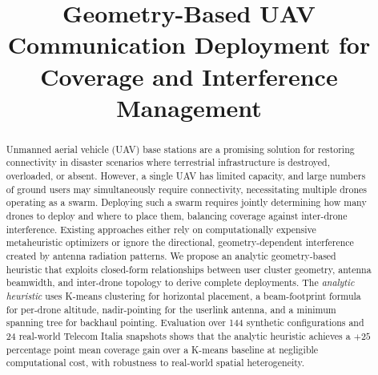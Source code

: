 \documentclass[conference]{IEEEtran}
\begin{document}

\title{Geometry-Based UAV Communication Deployment for Coverage and Interference Management}




\author{
}


\maketitle

\begin{abstract}
Unmanned aerial vehicle (UAV) base stations are a promising solution for restoring connectivity in disaster scenarios where terrestrial infrastructure is destroyed, overloaded, or absent. However, a single UAV has limited capacity, and large numbers of ground users may simultaneously require connectivity, necessitating multiple drones operating as a swarm. Deploying such a swarm requires jointly determining how many drones to deploy and where to place them, balancing coverage against inter-drone interference. Existing approaches either rely on computationally expensive metaheuristic optimizers or ignore the directional, geometry-dependent interference created by antenna radiation patterns. We propose an analytic geometry-based heuristic that exploits closed-form relationships between user cluster geometry, antenna beamwidth, and inter-drone topology to derive complete deployments. The \emph{analytic heuristic} uses K-means clustering for horizontal placement, a beam-footprint formula for per-drone altitude, nadir-pointing for the userlink antenna, and a minimum spanning tree for backhaul pointing. Evaluation over 144 synthetic configurations and 24 real-world Telecom Italia snapshots shows that the analytic heuristic achieves a $+25$ percentage point mean coverage gain over a K-means baseline at negligible computational cost, with robustness to real-world spatial heterogeneity.

\end{abstract}
\end{document}
